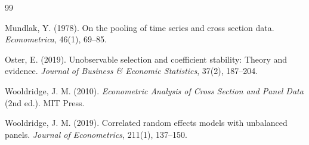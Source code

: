 \documentclass[12pt, a4paper]{article}
\begin{document}
\newpage

\begin{thebibliography}{99}

Mundlak, Y. (1978). On the pooling of time series and cross section data.
\textit{Econometrica}, 46(1), 69--85.

Oster, E. (2019). Unobservable selection and coefficient stability: Theory
and evidence. \textit{Journal of Business \& Economic Statistics}, 37(2),
187--204.

Wooldridge, J. M. (2010). \textit{Econometric Analysis of Cross Section and
Panel Data} (2nd ed.). MIT Press.

Wooldridge, J. M. (2019). Correlated random effects models with unbalanced
panels. \textit{Journal of Econometrics}, 211(1), 137--150.

\end{thebibliography}
\end{document}
